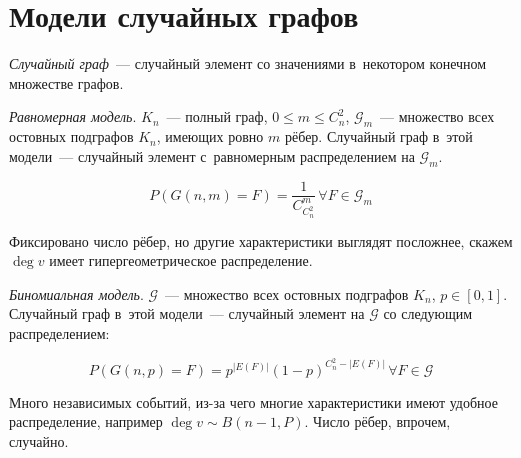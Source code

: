 \documentclass{article}
\begin{document}
\section{Модели случайных графов}

\begin{definition}
	\emph{Случайный граф}~--- случайный элемент со значениями в~некотором конечном
	множестве графов.
\end{definition}

\begin{definition}
	\emph{Равномерная модель}. $K_n$~--- полный граф, $0 \le m \le C_n^2$,
	$\mathcal{G}_m$~--- множество всех остовных подграфов $K_n$, имеющих ровно $m$
	рёбер. Случайный граф в~этой модели~--- случайный элемент с~равномерным
	распределением на $\mathcal{G}_m$.

	$$ P(G(n, m) = F) = \frac{1}{C_{C_n^2}^m} \,\forall F \in \mathcal{G}_m $$
\end{definition}

Фиксировано число рёбер, но другие характеристики выглядят посложнее, скажем
$\deg v$ имеет гипергеометрическое распределение.

\begin{definition}
	\emph{Биномиальная модель}. $\mathcal{G}$~--- множество всех остовных
	подграфов $K_n$, $p \in [0, 1]$. Случайный граф в~этой модели~--- случайный
	элемент на $\mathcal{G}$ со следующим распределением:

	$$ P(G(n, p) = F) = p^{|E(F)|} (1 - p)^{C_n^2 - |E(F)|} \, \forall F \in
	\mathcal{G}$$
\end{definition}

Много независимых событий, из-за чего многие характеристики имеют удобное
распределение, например $\deg v \sim B(n - 1, P)$. Число рёбер, впрочем,
случайно.
\end{document}
